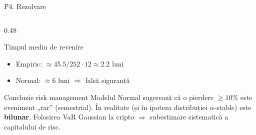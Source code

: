 \documentclass[9pt, aspectratio=169, t]{beamer}
\begin{document}
\begin{frame}[shrink=22]{P4. Rezolvare}
\begin{columns}[T]
\begin{column}{0.48\textwidth}
\begin{block}{Timpul mediu de revenire}
\begin{itemize}
    \item Empiric: $\approx 45.5/252\cdot 12 \approx 2.2$ luni
    \item Normal: $\approx 6$ luni $\Rightarrow$ falsă siguranță
\end{itemize}
\end{block}
\begin{alertblock}{Concluzie risk management}
Modelul Normal sugerează că o pierdere $\geq 10\%$ este eveniment „rar'' (semestrial). În realitate (și în ipoteza distribuției $\alpha$-stable) este \textbf{bilunar}. Folosirea VaR Gaussian la cripto $\Rightarrow$ subestimare sistematică a capitalului de risc.
\end{alertblock}
\end{column}
\end{columns}
\end{frame}
\end{document}
